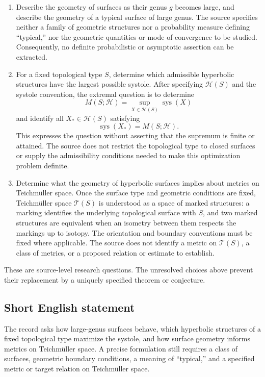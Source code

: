 \documentclass[11pt]{article}
\begin{document}
\begin{enumerate}
\item Describe the geometry of surfaces as their genus \(g\) becomes large, and describe the geometry of a typical surface of large genus. The source specifies neither a family of geometric structures nor a probability measure defining ``typical,'' nor the geometric quantities or mode of convergence to be studied. Consequently, no definite probabilistic or asymptotic assertion can be extracted.
\item For a fixed topological type \(S\), determine which admissible hyperbolic structures have the largest possible systole. After specifying \(\mathcal H(S)\) and the systole convention, the extremal question is to determine
\[
M(S;\mathcal H)=\sup_{X\in\mathcal H(S)}\operatorname{sys}(X)
\]
and identify all \(X_*\in\mathcal H(S)\) satisfying
\[
\operatorname{sys}(X_*)=M(S;\mathcal H).
\]
This expresses the question without asserting that the supremum is finite or attained. The source does not restrict the topological type to closed surfaces or supply the admissibility conditions needed to make this optimization problem definite.
\item Determine what the geometry of hyperbolic surfaces implies about metrics on Teichm\"uller space. Once the surface type and geometric conditions are fixed, Teichm\"uller space \(\mathcal T(S)\) is understood as a space of marked structures: a marking identifies the underlying topological surface with \(S\), and two marked structures are equivalent when an isometry between them respects the markings up to isotopy. The orientation and boundary conventions must be fixed where applicable. The source does not identify a metric on \(\mathcal T(S)\), a class of metrics, or a proposed relation or estimate to establish.
\end{enumerate}
These are source-level research questions. The unresolved choices above prevent their replacement by a uniquely specified theorem or conjecture.
\subsection{Short English statement}
The record asks how large-genus surfaces behave, which hyperbolic structures of a fixed topological type maximize the systole, and how surface geometry informs metrics on Teichm\"uller space. A precise formulation still requires a class of surfaces, geometric boundary conditions, a meaning of ``typical,'' and a specified metric or target relation on Teichm\"uller space.
\end{document}
